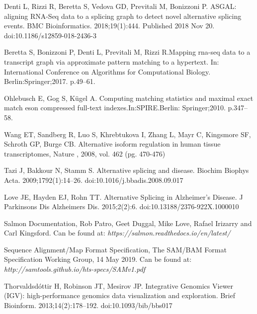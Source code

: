 \documentclass[a4paper,12pt]{article}
\begin{document}
		\begin{thebibliography}{9}

			Denti L, Rizzi R, Beretta S, Vedova GD, Previtali M, Bonizzoni P. ASGAL: aligning RNA-Seq data to a splicing graph to detect novel alternative splicing events. BMC Bioinformatics. 2018;19(1):444. Published 2018 Nov 20. doi:10.1186/s12859-018-2436-3
			
 Beretta S, Bonizzoni P, Denti L, Previtali M, Rizzi R.Mapping rna-seq data to a transcript graph via approximate pattern matching to a hypertext. In: International Conference on Algorithms for Computational Biology. Berlin:Springer;2017. p.49–61. 
 
 Ohlebusch E, Gog S, Kügel A. Computing matching statistics and maximal exact match eson compressed full-text indexes.In:SPIRE.Berlin: Springer;2010. p.347–58. 
			
				Wang ET,  Sandberg R,  Luo S,  Khrebtukova I,  Zhang L,  Mayr C,  Kingsmore SF,  Schroth GP,  Burge CB. Alternative isoform regulation in human tissue transcriptomes, Nature , 2008, vol. 462 (pg. 470-476)
				
Tazi J, Bakkour N, Stamm S. Alternative splicing and disease. Biochim Biophys Acta. 2009;1792(1):14–26. doi:10.1016/j.bbadis.2008.09.017
							
			Love JE, Hayden EJ, Rohn TT. Alternative Splicing in Alzheimer's Disease. J Parkinsons Dis Alzheimers Dis. 2015;2(2):6. doi:10.13188/2376-922X.1000010
			
			Salmon Documentation, Rob Patro, Geet Duggal, Mike Love, Rafael Irizarry and Carl Kingsford. Can be found at: \textit{https://salmon.readthedocs.io/en/latest/}
			
			Sequence Alignment/Map Format Specification, The SAM/BAM Format Specification Working Group, 14 May 2019. Can be found at: \textit{http://samtools.github.io/hts-specs/SAMv1.pdf}
			
			Thorvaldsdóttir H, Robinson JT, Mesirov JP. Integrative Genomics Viewer (IGV): high-performance genomics data visualization and exploration. Brief Bioinform. 2013;14(2):178–192. doi:10.1093/bib/bbs017
			
		\end{thebibliography}
		
\end{document}
